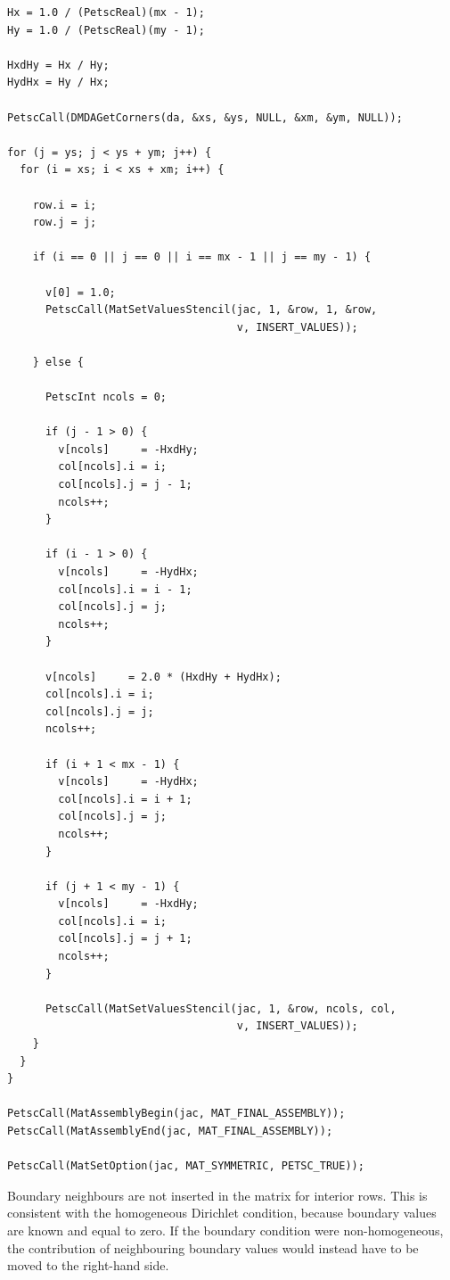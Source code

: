 \documentclass[unicode,10pt,a4paper,oneside,numbers=endperiod,openany]{scrartcl}
\begin{document}
\begin{lstlisting}[style=grayverbatim, caption={Assembly of the finite-difference matrix}, label={lst:compute_matrix}]
Hx = 1.0 / (PetscReal)(mx - 1);
Hy = 1.0 / (PetscReal)(my - 1);

HxdHy = Hx / Hy;
HydHx = Hy / Hx;

PetscCall(DMDAGetCorners(da, &xs, &ys, NULL, &xm, &ym, NULL));

for (j = ys; j < ys + ym; j++) {
  for (i = xs; i < xs + xm; i++) {

    row.i = i;
    row.j = j;

    if (i == 0 || j == 0 || i == mx - 1 || j == my - 1) {

      v[0] = 1.0;
      PetscCall(MatSetValuesStencil(jac, 1, &row, 1, &row,
                                    v, INSERT_VALUES));

    } else {

      PetscInt ncols = 0;

      if (j - 1 > 0) {
        v[ncols]     = -HxdHy;
        col[ncols].i = i;
        col[ncols].j = j - 1;
        ncols++;
      }

      if (i - 1 > 0) {
        v[ncols]     = -HydHx;
        col[ncols].i = i - 1;
        col[ncols].j = j;
        ncols++;
      }

      v[ncols]     = 2.0 * (HxdHy + HydHx);
      col[ncols].i = i;
      col[ncols].j = j;
      ncols++;

      if (i + 1 < mx - 1) {
        v[ncols]     = -HydHx;
        col[ncols].i = i + 1;
        col[ncols].j = j;
        ncols++;
      }

      if (j + 1 < my - 1) {
        v[ncols]     = -HxdHy;
        col[ncols].i = i;
        col[ncols].j = j + 1;
        ncols++;
      }

      PetscCall(MatSetValuesStencil(jac, 1, &row, ncols, col,
                                    v, INSERT_VALUES));
    }
  }
}

PetscCall(MatAssemblyBegin(jac, MAT_FINAL_ASSEMBLY));
PetscCall(MatAssemblyEnd(jac, MAT_FINAL_ASSEMBLY));

PetscCall(MatSetOption(jac, MAT_SYMMETRIC, PETSC_TRUE));
\end{lstlisting}

Boundary neighbours are not inserted in the matrix for interior rows. This is
consistent with the homogeneous Dirichlet condition, because boundary values are
known and equal to zero. If the boundary condition were non-homogeneous, the
contribution of neighbouring boundary values would instead have to be moved to
the right-hand side.
\end{document}

